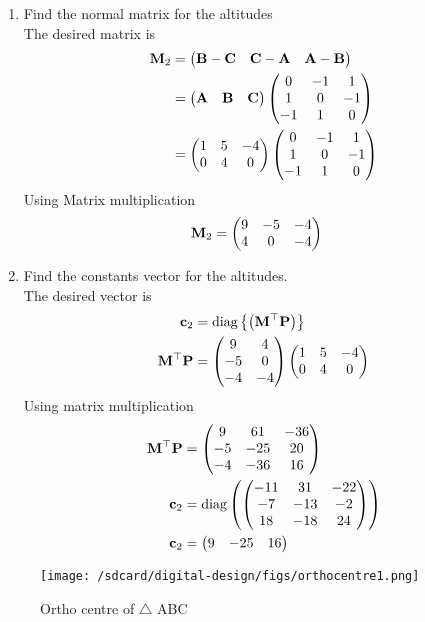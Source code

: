 \documentclass[11pt]{book}
\begin{document}
  
\begin{enumerate}[label=\thesubsection.\arabic*.,ref=\thesubsection.\theenumi]
\item Find the normal matrix for the altitudes \\
\solution  The desired matrix is 
\begin{align}
\mathbf{M}_2 &= \begin{pmatrix}\mathbf{B}-\mathbf{C} & \mathbf{C}-\mathbf{A} & \mathbf{A}-\mathbf{B} \end{pmatrix}
\\
&= 
\begin{pmatrix}\mathbf{A} & \mathbf{B} &\mathbf{C}\end{pmatrix}
\begin{pmatrix} 0 & -1 & 1 \\ 1 & 0 & -1 \\ -1 & 1 & 0\end{pmatrix} \\
&= 
\begin{pmatrix}1 & 5 & -4 \\ 0 & 4 & 0\end{pmatrix}
\begin{pmatrix} 0 & -1 & 1 \\ 1 & 0 & -1 \\ -1 & 1 & 0\end{pmatrix}
\end{align}
Using Matrix multiplication 
\begin{align}
   \mathbf{M}_2 &=\begin{pmatrix}9 & -5 & -4 \\ 4 & 0 & -4\end{pmatrix}
\end{align}
\item Find the constants vector for the altitudes. \\
\solution The desired vector is 
\begin{align}
\mathbf{c}_2 &= \text{diag}\left\{\left(\mathbf{M}^{\top}\mathbf{P}\right)\right\} \\
\mathbf{M}^{\top}\mathbf{P} &= \begin{pmatrix}9&4 \\ -5&0 \\ -4 &-4\end{pmatrix}\begin{pmatrix}1 & 5 & -4 \\ 0 & 4 & 0\end{pmatrix} \\
\end{align}
Using matrix multiplication
\begin{align}
 \mathbf{M}^{\top}\mathbf{P}    &=\begin{pmatrix} 9 & 61 & -36 \\ -5 & -25 & 20 \\ -4 & -36 & 16 \end{pmatrix} \\
    \mathbf{c}_2 &= \text{diag}\left( \begin{pmatrix} -11 & 31 & -22 \\ -7 & -13 & -2 \\ 18 & -18 & 24 \end{pmatrix} \right) \\
 \mathbf{c}_2   &= \begin{pmatrix} 9 & -25 & 16\end{pmatrix}
\end{align}
\end{enumerate}
\begin{figure}[H]
    \centering
    \texttt{[image: /sdcard/digital-design/figs/orthocentre1.png]}
    \caption{Ortho centre of $\triangle$ ABC}
    \label{fig:mat_alt1}
\end{figure}
\end{document}
